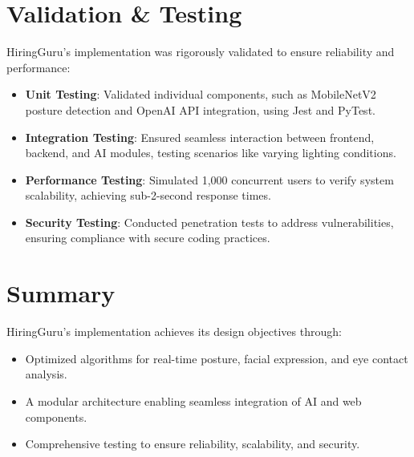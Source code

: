 \section{Validation \& Testing}
HiringGuru’s implementation was rigorously validated to ensure reliability and performance:
\begin{itemize}
    \item \textbf{Unit Testing}: Validated individual components, such as MobileNetV2 posture detection and OpenAI API integration, using Jest and PyTest.
    \item \textbf{Integration Testing}: Ensured seamless interaction between frontend, backend, and AI modules, testing scenarios like varying lighting conditions.
    \item \textbf{Performance Testing}: Simulated 1,000 concurrent users to verify system scalability, achieving sub-2-second response times.
    \item \textbf{Security Testing}: Conducted penetration tests to address vulnerabilities, ensuring compliance with secure coding practices.
\end{itemize}

\section{Summary}
HiringGuru’s implementation achieves its design objectives through:
\begin{itemize}
    \item Optimized algorithms for real-time posture, facial expression, and eye contact analysis.
    \item A modular architecture enabling seamless integration of AI and web components.
    \item Comprehensive testing to ensure reliability, scalability, and security.
\end{itemize}